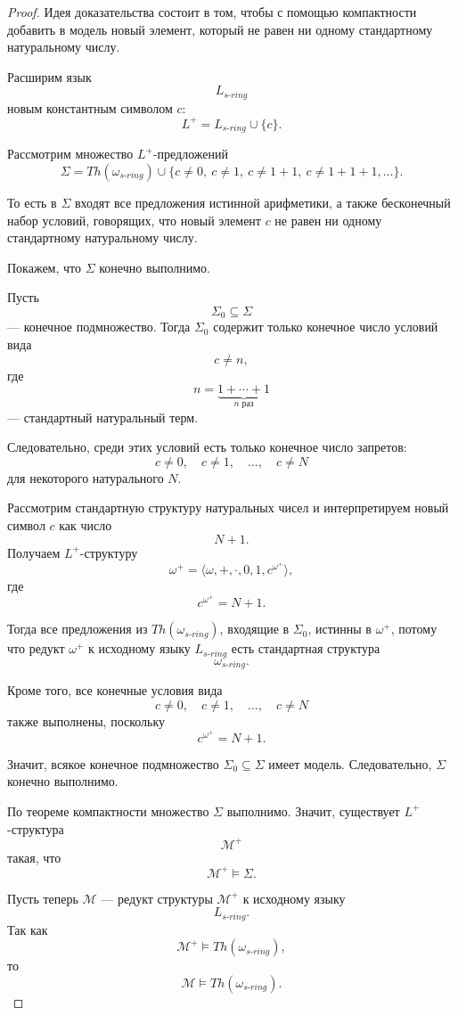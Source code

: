\documentclass[12pt,a4paper,oneside,openany]{book}
\theoremstyle{definition}
\theoremstyle{plain}
\theoremstyle{remark}
\begin{document}
\begin{proof}
Идея доказательства состоит в том, чтобы с помощью компактности добавить в модель новый элемент, который не равен ни одному стандартному натуральному числу.

Расширим язык
\[
L_{s\text{-}ring}
\]
новым константным символом $c$:
\[
L^+
=
L_{s\text{-}ring}\cup\{c\}.
\]

Рассмотрим множество $L^+$-предложений
\[
\Sigma
=
Th(\omega_{s\text{-}ring})
\cup
\{c\ne 0,\ c\ne 1,\ c\ne 1+1,\ c\ne 1+1+1,\ldots\}.
\]

То есть в $\Sigma$ входят все предложения истинной арифметики, а также бесконечный набор условий, говорящих, что новый элемент $c$ не равен ни одному стандартному натуральному числу.

Покажем, что $\Sigma$ конечно выполнимо.

Пусть
\[
\Sigma_0\subseteq \Sigma
\]
— конечное подмножество. Тогда $\Sigma_0$ содержит только конечное число условий вида
\[
c\ne n,
\]
где
\[
n=\underbrace{1+\cdots+1}_{n\text{ раз}}
\]
— стандартный натуральный терм.

Следовательно, среди этих условий есть только конечное число запретов:
\[
c\ne 0,\quad c\ne 1,\quad \ldots,\quad c\ne N
\]
для некоторого натурального $N$.

Рассмотрим стандартную структуру натуральных чисел и интерпретируем новый символ $c$ как число
\[
N+1.
\]
Получаем $L^+$-структуру
\[
\omega^+
=
\langle \omega,+,\cdot,0,1,c^{\omega^+}\rangle,
\]
где
\[
c^{\omega^+}=N+1.
\]

Тогда все предложения из $Th(\omega_{s\text{-}ring})$, входящие в $\Sigma_0$, истинны в $\omega^+$, потому что редукт $\omega^+$ к исходному языку $L_{s\text{-}ring}$ есть стандартная структура
\[
\omega_{s\text{-}ring}.
\]

Кроме того, все конечные условия вида
\[
c\ne 0,\quad c\ne 1,\quad \ldots,\quad c\ne N
\]
также выполнены, поскольку
\[
c^{\omega^+}=N+1.
\]

Значит, всякое конечное подмножество $\Sigma_0\subseteq\Sigma$ имеет модель. Следовательно, $\Sigma$ конечно выполнимо.

По теореме компактности множество $\Sigma$ выполнимо. Значит, существует $L^+$-структура
\[
\mathcal M^+
\]
такая, что
\[
\mathcal M^+\models\Sigma.
\]

Пусть теперь $\mathcal M$ — редукт структуры $\mathcal M^+$ к исходному языку
\[
L_{s\text{-}ring}.
\]
Так как
\[
\mathcal M^+\models Th(\omega_{s\text{-}ring}),
\]
то
\[
\mathcal M\models Th(\omega_{s\text{-}ring}).
\]


\end{proof}
\end{document}
